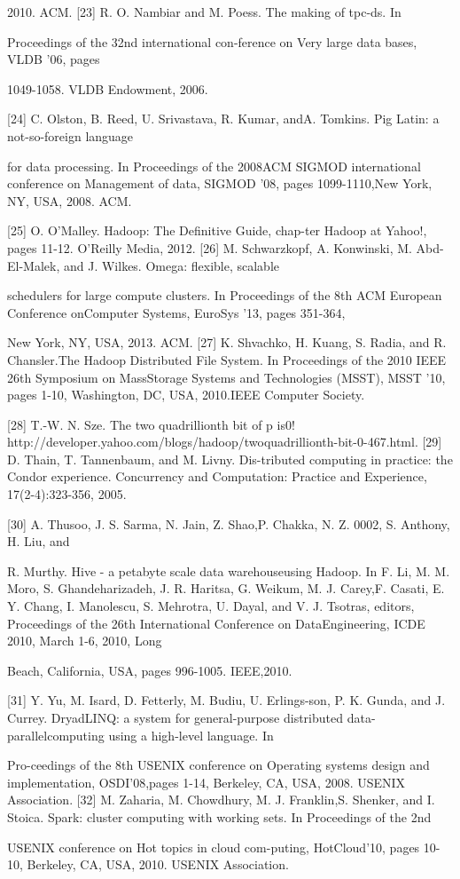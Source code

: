 2010. ACM.
[23] R. O. Nambiar and M. Poess. The making of tpc-ds. In

Proceedings of the 32nd international con-ference on Very large data bases, VLDB '06, pages

1049-1058. VLDB Endowment, 2006.

[24] C. Olston, B. Reed, U. Srivastava, R. Kumar, andA. Tomkins. Pig Latin: a not-so-foreign language

for data processing. In Proceedings of the 2008ACM SIGMOD international conference on Management of data, SIGMOD '08, pages 1099-1110,New York, NY, USA, 2008. ACM.

[25] O. O'Malley. Hadoop: The Definitive Guide, chap-ter Hadoop at Yahoo!, pages 11-12. O'Reilly Media, 2012.
[26] M. Schwarzkopf, A. Konwinski, M. Abd-El-Malek, and J. Wilkes. Omega: flexible, scalable

schedulers for large compute clusters. In Proceedings of the 8th ACM European Conference onComputer Systems, EuroSys '13, pages 351-364,

New York, NY, USA, 2013. ACM.
[27] K. Shvachko, H. Kuang, S. Radia, and R. Chansler.The Hadoop Distributed File System. In Proceedings of the 2010 IEEE 26th Symposium on MassStorage Systems and Technologies (MSST), MSST
'10, pages 1-10, Washington, DC, USA, 2010.IEEE Computer Society.

[28] T.-W. N. Sze. The two quadrillionth bit of p is0! http://developer.yahoo.com/blogs/hadoop/twoquadrillionth-bit-0-467.html.
[29] D. Thain, T. Tannenbaum, and M. Livny. Dis-tributed computing in practice: the Condor experience. Concurrency and Computation: Practice
and Experience, 17(2-4):323-356, 2005.

[30] A. Thusoo, J. S. Sarma, N. Jain, Z. Shao,P. Chakka, N. Z. 0002, S. Anthony, H. Liu, and

R. Murthy. Hive - a petabyte scale data warehouseusing Hadoop. In F. Li, M. M. Moro, S. Ghandeharizadeh, J. R. Haritsa, G. Weikum, M. J. Carey,F. Casati, E. Y. Chang, I. Manolescu, S. Mehrotra, U. Dayal, and V. J. Tsotras, editors, Proceedings of the 26th International Conference on DataEngineering, ICDE 2010, March 1-6, 2010, Long

Beach, California, USA, pages 996-1005. IEEE,2010.

[31] Y. Yu, M. Isard, D. Fetterly, M. Budiu, U. Erlings-son, P. K. Gunda, and J. Currey. DryadLINQ: a system for general-purpose distributed data-parallelcomputing using a high-level language. In

Pro-ceedings of the 8th USENIX conference on Operating systems design and implementation, OSDI'08,pages 1-14, Berkeley, CA, USA, 2008. USENIX
Association.
[32] M. Zaharia, M. Chowdhury, M. J. Franklin,S. Shenker, and I. Stoica. Spark: cluster computing with working sets. In Proceedings of the 2nd

USENIX conference on Hot topics in cloud com-puting, HotCloud'10, pages 10-10, Berkeley, CA,
USA, 2010. USENIX Association.